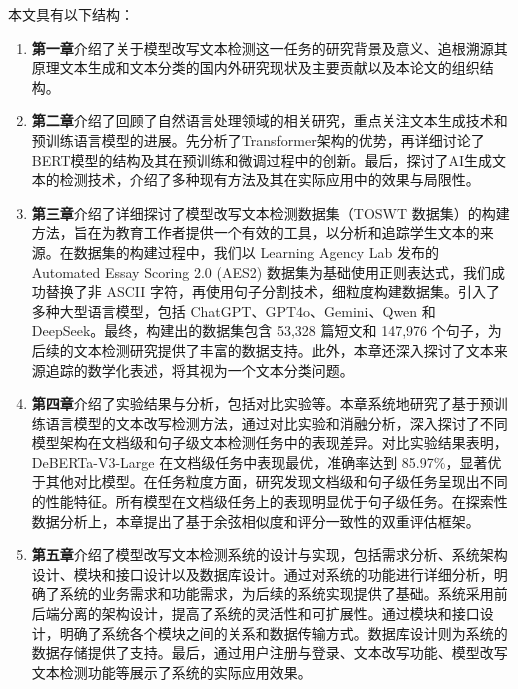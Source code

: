 本文具有以下结构：
\begin{enumerate}
    \item \textbf{第一章}介绍了关于模型改写文本检测这一任务的研究背景及意义、追根溯源其原理文本生成和文本分类的国内外研究现状及主要贡献以及本论文的组织结构。
    \item \textbf{第二章}介绍了回顾了自然语言处理领域的相关研究，重点关注文本生成技术和预训练语言模型的进展。先分析了Transformer架构的优势，再详细讨论了BERT模型的结构及其在预训练和微调过程中的创新。最后，探讨了AI生成文本的检测技术，介绍了多种现有方法及其在实际应用中的效果与局限性。
    \item \textbf{第三章}介绍了详细探讨了模型改写文本检测数据集（TOSWT 数据集）的构建方法，旨在为教育工作者提供一个有效的工具，以分析和追踪学生文本的来源。在数据集的构建过程中，我们以 Learning Agency Lab 发布的 Automated Essay Scoring 2.0 (AES2) 数据集为基础使用正则表达式，我们成功替换了非 ASCII 字符，再使用句子分割技术，细粒度构建数据集。引入了多种大型语言模型，包括 ChatGPT、GPT4o、Gemini、Qwen 和 DeepSeek。最终，构建出的数据集包含 53,328 篇短文和 147,976 个句子，为后续的文本检测研究提供了丰富的数据支持。此外，本章还深入探讨了文本来源追踪的数学化表述，将其视为一个文本分类问题。
    \item \textbf{第四章}介绍了实验结果与分析，包括对比实验等。本章系统地研究了基于预训练语言模型的文本改写检测方法，通过对比实验和消融分析，深入探讨了不同模型架构在文档级和句子级文本检测任务中的表现差异。对比实验结果表明，DeBERTa-V3-Large 在文档级任务中表现最优，准确率达到 85.97\%，显著优于其他对比模型。在任务粒度方面，研究发现文档级和句子级任务呈现出不同的性能特征。所有模型在文档级任务上的表现明显优于句子级任务。在探索性数据分析上，本章提出了基于余弦相似度和评分一致性的双重评估框架。
    \item \textbf{第五章}介绍了模型改写文本检测系统的设计与实现，包括需求分析、系统架构设计、模块和接口设计以及数据库设计。通过对系统的功能进行详细分析，明确了系统的业务需求和功能需求，为后续的系统实现提供了基础。系统采用前后端分离的架构设计，提高了系统的灵活性和可扩展性。通过模块和接口设计，明确了系统各个模块之间的关系和数据传输方式。数据库设计则为系统的数据存储提供了支持。最后，通过用户注册与登录、文本改写功能、模型改写文本检测功能等展示了系统的实际应用效果。
\end{enumerate}